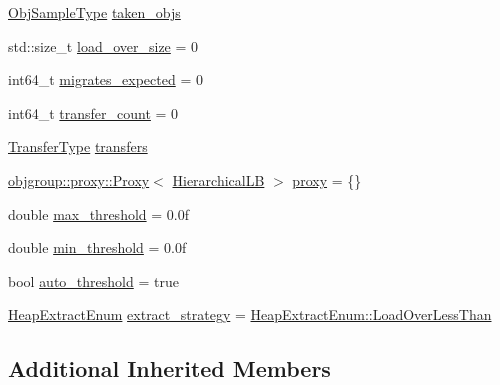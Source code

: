 \begin{DoxyCompactItemize}
\item 
\hyperlink{structvt_1_1vrt_1_1collection_1_1lb_1_1_base_l_b_a331d7da5bbf2883238427d86b54ddd7b}{Obj\+Sample\+Type} \hyperlink{structvt_1_1vrt_1_1collection_1_1lb_1_1_hierarchical_l_b_a72831d31662a79dcb0cf5e1f9f2499dc}{taken\+\_\+objs}
\item 
std\+::size\+\_\+t \hyperlink{structvt_1_1vrt_1_1collection_1_1lb_1_1_hierarchical_l_b_a8274c981c098fc5f1b807abfbf596882}{load\+\_\+over\+\_\+size} = 0
\item 
int64\+\_\+t \hyperlink{structvt_1_1vrt_1_1collection_1_1lb_1_1_hierarchical_l_b_a79229451e82b523ca25e81c8249cc048}{migrates\+\_\+expected} = 0
\item 
int64\+\_\+t \hyperlink{structvt_1_1vrt_1_1collection_1_1lb_1_1_hierarchical_l_b_a858f07d19923904e7a8bb4a93c96041c}{transfer\+\_\+count} = 0
\item 
\hyperlink{structvt_1_1vrt_1_1collection_1_1lb_1_1_base_l_b_a0a5f834082d85c558bdaf84c464c1ead}{Transfer\+Type} \hyperlink{structvt_1_1vrt_1_1collection_1_1lb_1_1_hierarchical_l_b_ab9aad1307a83953ea436e1e3d865bbd0}{transfers}
\item 
\hyperlink{structvt_1_1objgroup_1_1proxy_1_1_proxy}{objgroup\+::proxy\+::\+Proxy}$<$ \hyperlink{structvt_1_1vrt_1_1collection_1_1lb_1_1_hierarchical_l_b}{Hierarchical\+LB} $>$ \hyperlink{structvt_1_1vrt_1_1collection_1_1lb_1_1_hierarchical_l_b_a116c56497faa79eff02d0f4b9932eba5}{proxy} = \{\}
\item 
double \hyperlink{structvt_1_1vrt_1_1collection_1_1lb_1_1_hierarchical_l_b_a14170b4d5e34cb45fd9e3ba08f6886cb}{max\+\_\+threshold} = 0.\+0f
\item 
double \hyperlink{structvt_1_1vrt_1_1collection_1_1lb_1_1_hierarchical_l_b_ab7ef9cc6d966759b3634d04427cab1b5}{min\+\_\+threshold} = 0.\+0f
\item 
bool \hyperlink{structvt_1_1vrt_1_1collection_1_1lb_1_1_hierarchical_l_b_a4f1e749384f8ae015ed1aabaa1b9a732}{auto\+\_\+threshold} = true
\item 
\hyperlink{namespacevt_1_1vrt_1_1collection_1_1lb_aeb0f47cf4b89bed7ea05462d0c2e5b5e}{Heap\+Extract\+Enum} \hyperlink{structvt_1_1vrt_1_1collection_1_1lb_1_1_hierarchical_l_b_a3bbe0e2597f6c01024f058d20ae9d26e}{extract\+\_\+strategy} = \hyperlink{namespacevt_1_1vrt_1_1collection_1_1lb_aeb0f47cf4b89bed7ea05462d0c2e5b5ea41a33133c182e43b9dfc2599f39eaa94}{Heap\+Extract\+Enum\+::\+Load\+Over\+Less\+Than}
\end{DoxyCompactItemize}
\subsection*{Additional Inherited Members}


